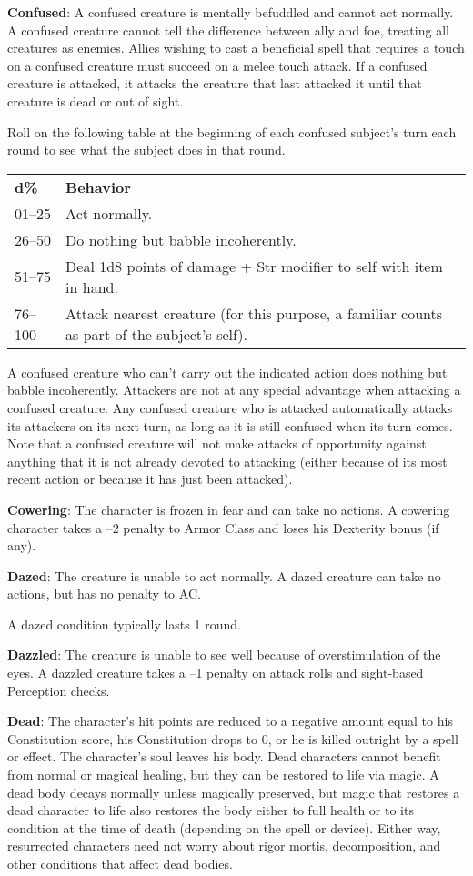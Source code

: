 \textbf{Confused}: A confused creature is mentally befuddled and cannot act normally. A confused creature cannot tell the difference between ally and foe, treating all creatures as enemies. Allies wishing to cast a beneficial spell that requires a touch on a confused creature must succeed on a melee touch attack. If a confused creature is attacked, it attacks the creature that last attacked it until that creature is dead or out of sight.
				
Roll on the following table at the beginning of each confused subject's turn each round to see what the subject does in that round. 


\begin{tabular}{ll}
\textbf{d\%} & \textbf{Behavior} \\
01--25 & Act normally.\\
26--50 & Do nothing but babble incoherently.\\
51--75 & Deal 1d8 points of damage + Str modifier to self with item in hand.\\
76--100 & Attack nearest creature (for this purpose, a familiar counts as part of the subject's self).\\
\end{tabular}

A confused creature who can't carry out the indicated action does nothing but babble incoherently. Attackers are not at any special advantage when attacking a confused creature. Any confused creature who is attacked automatically attacks its attackers on its next turn, as long as it is still confused when its turn comes. Note that a confused creature will not make attacks of opportunity against anything that it is not already devoted to attacking (either because of its most recent action or because it has just been attacked).
				
\textbf{Cowering}: The character is frozen in fear and can take no actions. A cowering character takes a --2 penalty to Armor Class and loses his Dexterity bonus (if any).
				
\textbf{Dazed}: The creature is unable to act normally. A dazed creature can take no actions, but has no penalty to AC.
				
A dazed condition typically lasts 1 round.
				
\textbf{Dazzled}: The creature is unable to see well because of overstimulation of the eyes. A dazzled creature takes a --1 penalty on attack rolls and sight-based Perception checks.
				
\textbf{Dead}: The character's hit points are reduced to a negative amount equal to his Constitution score, his Constitution drops to 0, or he is killed outright by a spell or effect. The character's soul leaves his body. Dead characters cannot benefit from normal or magical healing, but they can be restored to life via magic. A dead body decays normally unless magically preserved, but magic that restores a dead character to life also restores the body either to full health or to its condition at the time of death (depending on the spell or device). Either way, resurrected characters need not worry about rigor mortis, decomposition, and other conditions that affect dead bodies.
				
